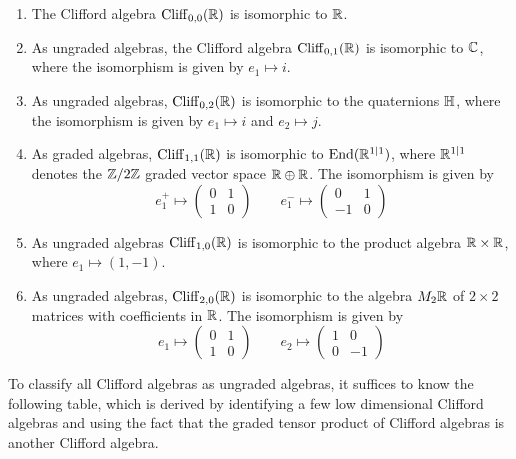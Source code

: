 \begin{exmp}\enumbreak
\begin{enumerate}
  \item The Clifford algebra $\operatorname{Cliff}_{0,0}(\mathbb{R})$ is isomorphic to $\mathbb{R}$.
  \item As ungraded algebras, the Clifford algebra $\operatorname{Cliff}_{0,1}(\mathbb{R})$ is isomorphic
  to $\mathbb{C}$, where the isomorphism is given by $e_1 \mapsto i$.
  \item As ungraded algebras, $\operatorname{Cliff}_{0,2}(\mathbb{R})$ is isomorphic to the quaternions
  $\mathbb{H}$, where the isomorphism is given by $e_1 \mapsto i$ and $e_2 \mapsto j$.
  \item As graded algebras, $\operatorname{Cliff}_{1,1}(\mathbb{R})$ is isomorphic to $\operatorname{End}(\mathbb{R}^{1|1})$,
  where $\mathbb{R}^{1|1}$ denotes the $\mathbb{Z}/2\mathbb{Z}$ graded vector space $\mathbb{R} \oplus \mathbb{R}$.
  The isomorphism is given by
  \[
  e_1^+ \mapsto \begin{pmatrix}
  0 & 1 \\
  1 & 0
  \end{pmatrix} \qquad e_1^- \mapsto \begin{pmatrix}
  0 & 1 \\
  -1 & 0
  \end{pmatrix}
  \]
  \item As ungraded algebras $\operatorname{Cliff}_{1,0}(\mathbb{R})$ is isomorphic to the product
  algebra $\mathbb{R} \times \mathbb{R}$, where $e_1 \mapsto (1,-1)$.
  \item As ungraded algebras, $\operatorname{Cliff}_{2,0}(\mathbb{R})$ is isomorphic to the algebra $M_2\mathbb{R}$
  of $2 \times 2$ matrices with coefficients in $\mathbb{R}$. The isomorphism is given by
  \[
  e_1 \mapsto \begin{pmatrix}
  0 & 1 \\
  1 & 0
  \end{pmatrix} \qquad e_2 \mapsto \begin{pmatrix}
  1 & 0 \\
  0 & -1
  \end{pmatrix}
  \]
\end{enumerate}
\end{exmp}
%
To classify all Clifford algebras as ungraded algebras, it suffices to know
the following table, which is derived by identifying a few low dimensional
Clifford algebras and using the fact that the graded tensor product of
Clifford algebras is another Clifford algebra. \\\\
